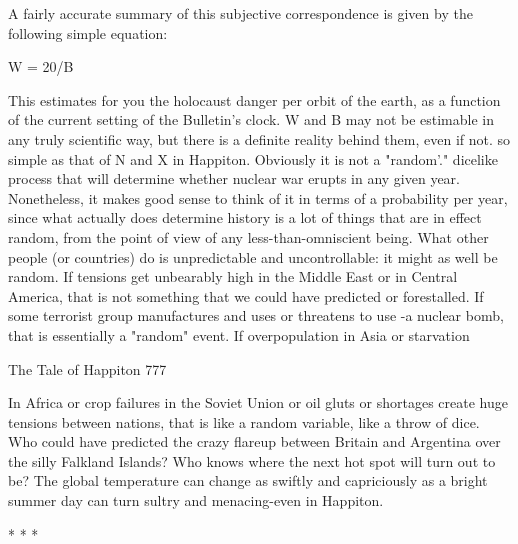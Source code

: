 A fairly accurate summary of this subjective correspondence is given by the following
simple equation:

       W = 20/B

This estimates for you the holocaust danger per orbit of the earth, as a function of the
current setting of the Bulletin's clock.
        W and B may not be estimable in any truly scientific way, but there is a
definite reality behind them, even if not. so simple as that of N and X in Happiton.
Obviously it is not a "random'." dicelike process that will determine whether nuclear
war erupts in any given year. Nonetheless, it makes good sense to think of it in terms
of a probability per year, since what actually does determine history is a lot of things
that are in effect random, from the point of view of any less-than-omniscient being.
What other people (or countries) do is unpredictable and uncontrollable: it might as
well be random.
        If tensions get unbearably high in the Middle East or in Central America, that
is not something that we could have predicted or forestalled. If some terrorist group
manufactures and uses or threatens to use -a nuclear bomb, that is essentially a
"random" event. If overpopulation in Asia or starvation




The Tale of Happiton                                                                   777

In Africa or crop failures in the Soviet Union or oil gluts or shortages create huge
tensions between nations, that is like a random variable, like a throw of dice. Who
could have predicted the crazy flareup between Britain and Argentina over the silly
Falkland Islands? Who knows where the next hot spot will turn out to be? The global
temperature can change as swiftly and capriciously as a bright summer day can turn
sultry and menacing-even in Happiton.

                                        *       *       *

